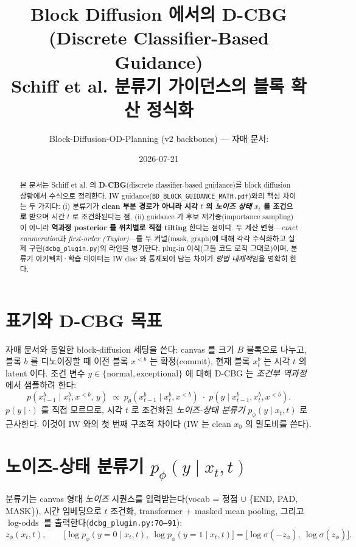 \documentclass[11pt]{article}
\title{\bfseries Block Diffusion 에서의 D-CBG (Discrete Classifier-Based Guidance)\\[2pt]
\large Schiff et al. 분류기 가이던스의 블록 확산 정식화}
\author{Block-Diffusion-OD-Planning \quad (v2 backbones) \quad — 자매 문서: \code{BD\_BLOCK\_GUIDANCE\_MATH.pdf}}
\date{2026-07-21}
\newcommand{\code}[1]{\texttt{\small #1}}
\newcommand{\xpre}{x^{<b}}
\newcommand{\xblk}{x^{b}}
\newcommand{\pth}{p_\theta}
\newcommand{\pphi}{p_\phi}
\theoremstyle{plain}
\theoremstyle{definition}
\begin{document}
\maketitle

\begin{abstract}
\noindent
본 문서는 Schiff et al. 의 \textbf{D-CBG}(discrete classifier-based guidance)를
block diffusion 상황에서 수식으로 정리한다.
IW guidance(\code{BD\_BLOCK\_GUIDANCE\_MATH.pdf})와의 핵심 차이는 두 가지다:
(i) 분류기가 \textbf{clean 부분 경로가 아니라 시각 $t$ 의 \emph{노이즈 상태} $x_t$ 를 조건으로}
받으며 시간 $t$ 로 조건화된다는 점, (ii) guidance 가 후보 재가중(importance sampling)이
아니라 \textbf{역과정 posterior 를 위치별로 직접 tilting} 한다는 점이다.
두 계산 변형—\emph{exact enumeration}과 \emph{first-order (Taylor)}—를 두 커널(mask, graph)에
대해 각각 수식화하고 실제 구현(\code{dcbg\_plugin.py})의 라인을 병기한다.
plug-in 이식(그들 코드 로직 그대로)이며, 분류기 아키텍처·학습 데이터는 IW disc 와
통제되어 남는 차이가 \emph{방법 내재적}임을 명확히 한다.
\end{abstract}

\section{표기와 D-CBG 목표}
자매 문서와 동일한 block-diffusion 세팅을 쓴다: canvas 를 크기 $B$ 블록으로 나누고,
블록 $b$ 를 디노이징할 때 이전 블록 $\xpre$ 는 확정(commit), 현재 블록 $\xblk_t$ 는
시각 $t$ 의 latent 이다. 조건 변수 $y\in\{\text{normal},\text{exceptional}\}$ 에 대해
D-CBG 는 \emph{조건부 역과정}에서 샘플하려 한다:
\begin{equation}
p(\xblk_{t-1}\mid \xblk_t,\xpre,\,y)\;\propto\;
\pth(\xblk_{t-1}\mid \xblk_t,\xpre)\;\cdot\;p(y\mid \xblk_{t-1},\xblk_t,\xpre).
\label{eq:bayes}
\end{equation}
$p(y\mid\cdot)$ 를 직접 모르므로, 시각 $t$ 로 조건화된 \emph{노이즈-상태 분류기}
$\pphi(y\mid x_t,t)$ 로 근사한다. 이것이 IW 와의 첫 번째 구조적 차이다
(IW 는 clean $x_0$ 의 밀도비를 쓴다).

\section{노이즈-상태 분류기 $\pphi(y\mid x_t,t)$}
분류기는 canvas 형태 \emph{노이즈} 시퀀스를 입력받는다(vocab = 정점 $\cup$ \{END, PAD, MASK\}),
시간 임베딩으로 $t$ 조건화, transformer + masked mean pooling, 그리고
$\log\text{-odds}$ 를 출력한다(\code{dcbg\_plugin.py:70--91}):
\begin{equation}
z_\phi(x_t,t),\qquad
\big[\log\pphi(y{=}0\mid x_t,t),\ \log\pphi(y{=}1\mid x_t,t)\big]
=\big[\log\sigma(-z_\phi),\ \log\sigma(z_\phi)\big].
\end{equation}
\end{document}
